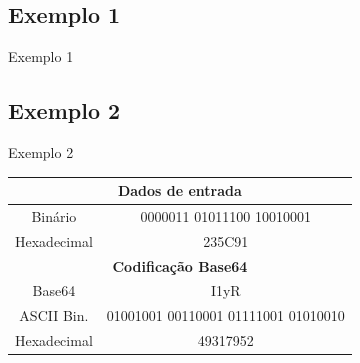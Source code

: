\documentclass[pdf]{beamer}
\begin{document}
\subsection{Exemplo 1}
\begin{frame}{Exemplo 1}
\transdissolve
\begin{table}
\begin{center}
\end{center}
\end{table}
\end{frame}
\subsection{Exemplo 2}
\begin{frame}{Exemplo 2}
\transdissolve
\begin{table}
\begin{center}
\begin{tabular}{|cc|} \hline
\multicolumn{2}{|c|}{\textbf{Dados de entrada}} \\ \hline
Binário & 0000011 01011100 10010001 \\ \hline
Hexadecimal & 235C91 \\ \hline \hline
\multicolumn{2}{|c|}{\textbf{Codificação Base64}} \\ \hline \hline
Base64 & I1yR \\ \hline
ASCII Bin. & 01001001 00110001 01111001 01010010 \\ \hline
Hexadecimal & 49317952 \\ \hline
\end{tabular}
\end{center}
\end{table}
\end{frame}
\end{document}
